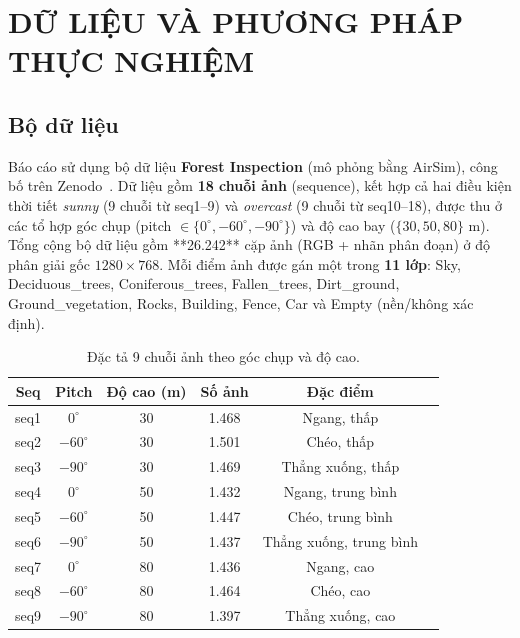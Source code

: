 \chapter{DỮ LIỆU VÀ PHƯƠNG PHÁP THỰC NGHIỆM}
\label{ch:du_lieu}

\section{Bộ dữ liệu}

Báo cáo sử dụng bộ dữ liệu \textbf{Forest Inspection} (mô phỏng bằng AirSim), công bố trên Zenodo~\cite{forestdataset}. Dữ liệu gồm \textbf{18 chuỗi ảnh} (sequence), kết hợp cả hai điều kiện thời tiết \textit{sunny} (9 chuỗi từ seq1--9) và \textit{overcast} (9 chuỗi từ seq10--18), được thu ở các tổ hợp góc chụp (pitch $\in\{0^\circ, -60^\circ, -90^\circ\}$) và độ cao bay ($\{30, 50, 80\}$ m). Tổng cộng bộ dữ liệu gồm **26.242** cặp ảnh (RGB + nhãn phân đoạn) ở độ phân giải gốc $1280\times 768$. Mỗi điểm ảnh được gán một trong \textbf{11 lớp}: Sky, Deciduous\_trees, Coniferous\_trees, Fallen\_trees, Dirt\_ground, Ground\_vegetation, Rocks, Building, Fence, Car và Empty (nền/không xác định).

\begin{table}[H]
\centering
\caption{Đặc tả 9 chuỗi ảnh theo góc chụp và độ cao.}
\label{tab:sequences}
\small
\begin{tabular}{c c c c c l}
\toprule
\textbf{Seq} & \textbf{Pitch} & \textbf{Độ cao (m)} & \textbf{Số ảnh} & \textbf{Đặc điểm} \\
\midrule
seq1 & $0^\circ$   & 30 & 1.468 & Ngang, thấp \\
seq2 & $-60^\circ$ & 30 & 1.501 & Chéo, thấp \\
seq3 & $-90^\circ$ & 30 & 1.469 & Thẳng xuống, thấp \\
seq4 & $0^\circ$   & 50 & 1.432 & Ngang, trung bình \\
seq5 & $-60^\circ$ & 50 & 1.447 & Chéo, trung bình \\
seq6 & $-90^\circ$ & 50 & 1.437 & Thẳng xuống, trung bình \\
seq7 & $0^\circ$   & 80 & 1.436 & Ngang, cao \\
seq8 & $-60^\circ$ & 80 & 1.464 & Chéo, cao \\
seq9 & $-90^\circ$ & 80 & 1.397 & Thẳng xuống, cao \\
\bottomrule
\end{tabular}
\end{table}

